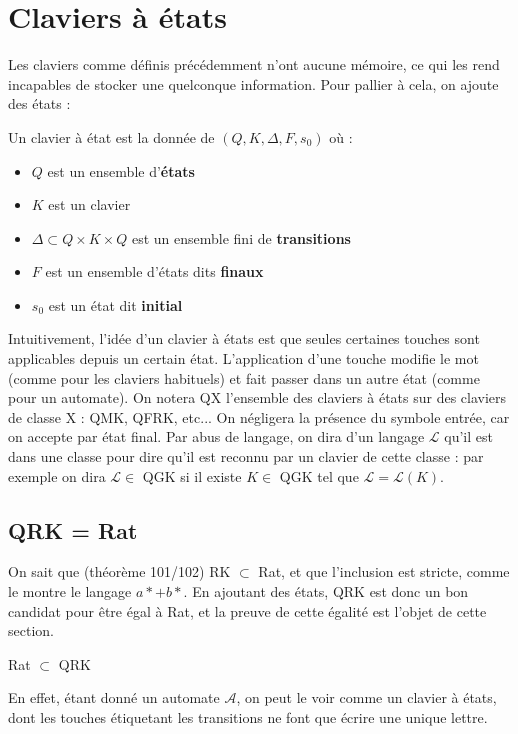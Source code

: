 \documentclass[12pt,a4paper]{article}
\renewcommand{\L}{\mathcal{L}}
\begin{document}
	\section{Claviers à états}
    Les claviers comme définis précédemment n'ont aucune mémoire, ce qui les rend incapables de stocker une quelconque information.
    Pour pallier à cela, on ajoute des états :
    \begin{defétats}
        Un clavier à état est la donnée de $(Q,K,\Delta ,F,s_0)$ où :
        \begin{itemize}
            \item $Q$ est un ensemble d'\textbf{états}
            \item $K$ est un clavier
            \item $\Delta \subset Q \times K \times Q$ est un ensemble fini de \textbf{transitions}
            \item $F$ est un ensemble d'états dits \textbf{finaux}
            \item $s_0$ est un état dit \textbf{initial}
        \end{itemize}
    \end{defétats}
    Intuitivement, l'idée d'un clavier à états est que seules certaines touches sont applicables depuis un certain état. L'application d'une touche modifie le mot (comme pour les claviers habituels)
    et fait passer dans un autre état (comme pour un automate).
    On notera QX l'ensemble des claviers à états sur des claviers de classe X : QMK, QFRK, etc... 
    On négligera la présence du symbole entrée, car on accepte par état final.
    Par abus de langage, on dira d'un langage $\L$ qu'il est dans une classe pour dire qu'il est reconnu par un clavier de cette classe : 
    par exemple on dira $\L \in$ QGK si il existe $K \in$ QGK tel que $\L = \L(K)$.


    \subsection{QRK = Rat}
    On sait que (théorème 101/102) RK $\subset$ Rat, et que l'inclusion est stricte, comme le montre le langage $a* + b*$. En ajoutant des états,
    QRK est donc un bon candidat pour être égal à Rat, et la preuve de cette égalité est l'objet de cette section.
    
    \begin{RatdansQRK}
        Rat $\subset$ QRK
    \end{RatdansQRK}
    En effet, étant donné un automate $\mathcal{A}$, on peut le voir comme un clavier à états, dont les touches étiquetant les transitions 
    ne font que écrire une unique lettre.
\end{document}
